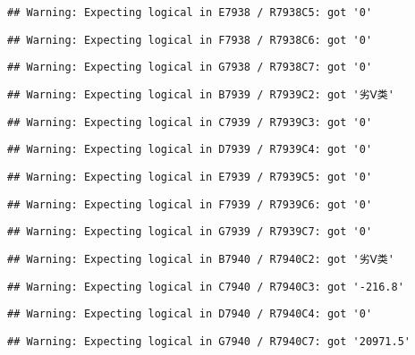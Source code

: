 \documentclass[
]{article}
\begin{document}
\begin{verbatim}
## Warning: Expecting logical in E7938 / R7938C5: got '0'
\end{verbatim}

\begin{verbatim}
## Warning: Expecting logical in F7938 / R7938C6: got '0'
\end{verbatim}

\begin{verbatim}
## Warning: Expecting logical in G7938 / R7938C7: got '0'
\end{verbatim}

\begin{verbatim}
## Warning: Expecting logical in B7939 / R7939C2: got '劣Ⅴ类'
\end{verbatim}

\begin{verbatim}
## Warning: Expecting logical in C7939 / R7939C3: got '0'
\end{verbatim}

\begin{verbatim}
## Warning: Expecting logical in D7939 / R7939C4: got '0'
\end{verbatim}

\begin{verbatim}
## Warning: Expecting logical in E7939 / R7939C5: got '0'
\end{verbatim}

\begin{verbatim}
## Warning: Expecting logical in F7939 / R7939C6: got '0'
\end{verbatim}

\begin{verbatim}
## Warning: Expecting logical in G7939 / R7939C7: got '0'
\end{verbatim}

\begin{verbatim}
## Warning: Expecting logical in B7940 / R7940C2: got '劣Ⅴ类'
\end{verbatim}

\begin{verbatim}
## Warning: Expecting logical in C7940 / R7940C3: got '-216.8'
\end{verbatim}

\begin{verbatim}
## Warning: Expecting logical in D7940 / R7940C4: got '0'
\end{verbatim}

\begin{verbatim}
## Warning: Expecting logical in G7940 / R7940C7: got '20971.5'
\end{verbatim}
\end{document}
